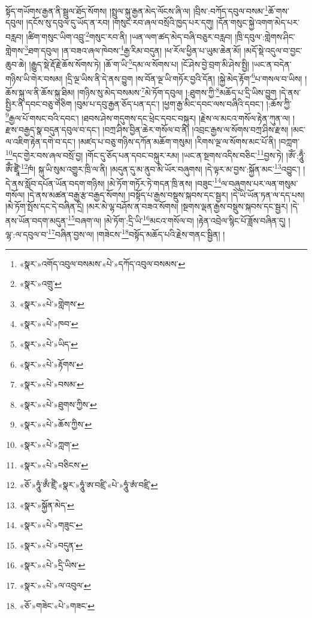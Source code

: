 སྟོད་གཡོགས་རྒྱན་ནི་སྦྲུལ་ཐོད་སོགས། །སྤྲུལ་སྐུ་རྒྱན་མེད་ལོངས་ཞི་ལ། །བྲིས་:བཀོད་དབུལ་བསམ་\footnote{«སྣར་»འགོད་འབུལ་བསམས་«པེ་»དཀོད་འབུལ་བསམས་}ཆོ་གས་དབུལ། །དངོས་སུ་དབུལ་དུ་ཡོད་ན་རབ། །གསུང་རབ་ཞལ་བསྲོའི་ཁྱད་པར་དགུ། །དོན་གསུང་སྐྱེ་འགག་མེད་པར་བརླབ། །ཚིག་གསུང་ཡིག་འབྲུ་\footnote{«སྣར་»འགྲུ་}གསུང་རབ་ནི། །ཡན་ལག་ཚད་མེད་བཞི་བཅུར་བརླབ། །ཁྲི་དབུལ་:གླེགས་ཤིང་གླེགས་\footnote{«སྣར་»«པེ་»གླེགས་}ཐག་དབུལ། །ན་བཟའ་ཞལ་ཁེབས་\footnote{«སྣར་»«པེ་»ཁབ་}རྒྱ་རིམ་བདུན། །ཕ་རོལ་ཕྱིན་པ་ཡུམ་ཆེན་མོ། །མདོ་སྡེ་འདུལ་བ་བྱང་ཆུབ་ཆེ། །རྒྱུད་སྡེ་རྡོ་རྗེ་ཆོས་སོགས་ཏེ། །ཆོ་ག་ཡི་\footnote{«སྣར་»«པེ་»ཡིད་}དམ་ལ་སོགས་པ། །ངོ་ཤེས་བྱེ་བྲག་མི་ཤེས་སྤྱི། །ཡང་ན་བདེན་གཉིས་ཡི་གེར་བསམ། །དྲི་ལྔ་ཡིས་ནི་དེ་ནས་བྱུག །ས་བོན་ལྔ་ཡི་གཏོར་བྱའི་དོན། །སྐྱེ་མེད་རྟོག་\footnote{«སྣར་»«པེ་»རྟོགས་}པ་གསལ་བ་ཡིས། །ཆོས་སྐུ་ལ་ནི་ཆོས་སྐུ་ཐིམ། །གཉིས་སུ་མེད་བསམས་\footnote{«སྣར་»«པེ་»བསམ་}མེ་ཏོག་དབུལ། །:ཐུགས་ཀྱི་\footnote{«སྣར་»«པེ་»ཐུགས་ཀྱིས་}མཆོད་པ་དྲི་ཡིས་བྱུག །དེ་ནས་སྤྱིར་ནི་དབང་བཅུ་གཅིག །བུམ་པ་དབུ་རྒྱན་ཅོད་པན་དང་། །ཕྱག་རྒྱ་མིང་དབང་ལས་བཞིའི་དབང་། །:ཆོས་ཀྱི་\footnote{«སྣར་»«པེ་»ཆོས་ཀྱིས་}རྒྱལ་པོ་གསང་བའི་དབང་། །ཐབས་ཤེས་གདུགས་དང་ཕྲེང་དབང་བསྐུར། །རྗེས་ལ་མངའ་གསོལ་རྟེན་ཀུན་ལ། །རྫས་བརྒྱད་སྣ་བདུན་དབུལ་བ་དང་། །བཀྲ་ཤིས་བྱིན་ཆེར་གསོལ་བ་ནི། །འབྲང་རྒྱས་ལ་སོགས་བཀྲ་ཤིས་རྫས། །མང་ལ་འཇིག་རྟེན་དགེ་བ་དང་། །མཛད་པ་བཅུ་གཉིས་དཀོན་མཆོག་གསུམ། །རིགས་ལྔ་ལ་སོགས་མང་པོ་ནི། །བཀླག་\footnote{«སྣར་»«པེ་»ཀླག་}དང་གྱེར་བས་ཞལ་བསྲོ་བྱ། །གོང་དུ་ཅོད་པན་དབང་བསྐུར་རམ། །ཡང་ན་སྔགས་འདིས་བཅིང་\footnote{«སྣར་»«པེ་»བཅིངས་}བྱས་ཏེ། །ཨོཾ་:ཧཱུྃ་ཨོྃ་ཛྲཱྀཾ་\footnote{«ཅོ་»ཧཱུཾ་ཨྃ་ཛྲྀཾ་«སྣར་»ཧཱུཾ་ཨ་བཛྲི་«པེ་»ཧཱུཾ་ཨཾ་བཛྲི་}ཁཾ། སྐུ་ཡི་སུམ་འགྱུར་ཁྲི་ལ་ནི། །མདུན་དུ་མ་ནུབ་མི་ཡོར་བཞུགས། །དེ་ལྟར་མ་བྱས་:སྐྱོན་མང་\footnote{«སྣར་»སྐྱོན་མེད་}འབྱུང་། །དེ་ནས་སློབ་དཔོན་ཡོན་བདག་གཉིས། །མེ་ཏོག་གཏོར་ཏེ་གདན་ཁྲི་ནས། །བཟུང་\footnote{«སྣར་»«པེ་»གཟུང་}ལ་བཞུགས་པར་ལན་གསུམ་གསོལ། །དེ་ནས་མཚན་བརྒྱ་རྩ་བརྒྱད་སོགས། །བསྟོད་པ་རྒྱས་བསྡུས་སྐབས་དང་སྦྱར། །དེ་ཡི་ཡོན་ཏན་ལ་དད་པས། །མེ་ཏོག་སྤོས་དང་དེ་བཞིན་དྲི། །མར་མེ་ལྷ་བཤོས་ན་བཟའ་སོགས། །སྔགས་ལྡན་རྒྱས་བསྡུས་སྐབས་དང་སྦྱར། །དེ་ནས་ཡོན་བདག་མདུན་\footnote{«སྣར་»«པེ་»བདུན་}བཞག་ལ། །མེ་ཏོག་:དྲི་ཡི་\footnote{«སྣར་»«པེ་»དྲི་ཡིས་}མངའ་གསོལ་བ། །རྟེན་འབྲེལ་སྙིང་པོ་ཟློས་བཞིན་དུ། །ལྷ་:ལ་དབུལ་བ་\footnote{«སྣར་»«པེ་»ལ་འབུལ་}བཞིན་བྱས་ལ། །གཟེངས་\footnote{«ཅོ་»གཟེང་«པེ་»གཟང་}བསྟོད་མཆོད་པའི་རྗེས་གནང་སྦྱིན། །
